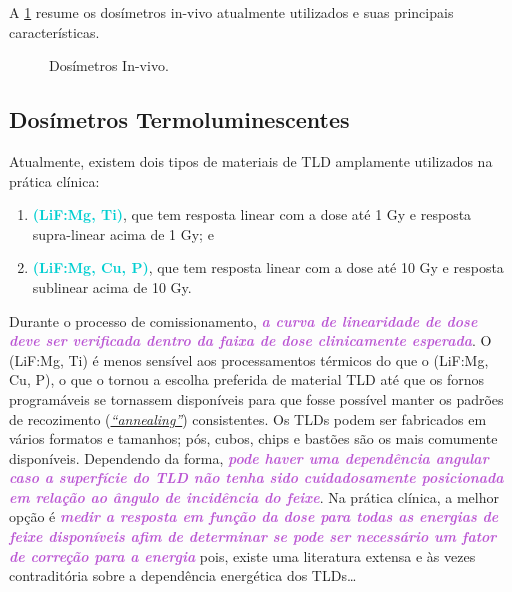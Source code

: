 \documentclass[11pt,a4paper]{article}
\begin{document}
	A \ref{fig:dosimetrosInVivo} resume os dosímetros in-vivo atualmente utilizados e suas principais características.

	\begin{figure}[h]
		\centering
		\caption{Dosímetros In-vivo.}
		\label{fig:dosimetrosInVivo}
	\end{figure}

\subsection*{Dosímetros Termoluminescentes}

	Atualmente, existem dois tipos de materiais de TLD amplamente utilizados na prática clínica:
	
	\begin{enumerate}[label=\textcolor{CarnationPink}{\arabic*${}^\circ $}]
		\item \textcolor{DarkTurquoise}{\textbf{(LiF:Mg, Ti)}}, que tem resposta linear com a dose até 1 Gy e resposta supra-linear acima de 1 Gy; e
		\item \textcolor{DarkTurquoise}{\textbf{(LiF:Mg, Cu, P)}}, que tem resposta linear com a dose até 10 Gy e resposta sublinear acima de 10 Gy.
	\end{enumerate}
	
	Durante o processo de comissionamento, \textcolor{MediumOrchid}{\textbf{\textit{a curva de linearidade de dose deve ser verificada dentro da faixa de dose clinicamente esperada}}}. O (LiF:Mg, Ti) é menos sensível aos processamentos térmicos do que o (LiF:Mg, Cu, P), o que o tornou a escolha preferida de material TLD até que os fornos programáveis se tornassem disponíveis para que fosse possível manter os padrões de recozimento (\hyperref[exp:annealing]{\textit{``annealing''}}) consistentes. Os TLDs podem ser fabricados em vários formatos e tamanhos; pós, cubos, chips e bastões são os mais comumente disponíveis. Dependendo da forma, \textcolor{MediumOrchid}{\textbf{\textit{pode haver uma dependência angular caso a superfície do TLD não tenha sido cuidadosamente posicionada em relação ao ângulo de incidência do feixe}}}. Na prática clínica, a melhor opção é \textcolor{MediumOrchid}{\textbf{\textit{medir a resposta em função da dose para todas as energias de feixe disponíveis afim de determinar se pode ser necessário um fator de correção para a energia}}} pois, existe uma literatura extensa e às vezes contraditória sobre a dependência energética dos TLDs\dots
\end{document}

